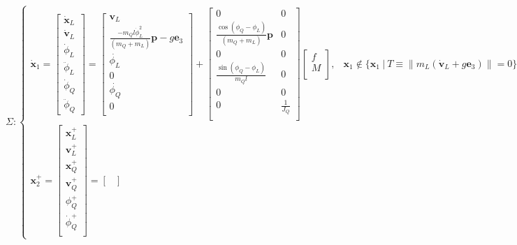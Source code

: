 \documentclass[11pt]{article}
\begin{document}
\[
 \Sigma :
\begin{cases}
\dot{\mathbf{x}}_1 = 
\begin{bmatrix}
       \dot{\mathbf{x}}_L \\ \dot{\mathbf{v}}_L \\ \dot{\phi}_L \\ \ddot{\phi}_L \\ \dot{\phi}_Q \\ \ddot{\phi}_Q
\end{bmatrix}
= 
\begin{bmatrix}
       \mathbf{v}_L \\
       \frac{ - m_Q l \dot{\phi}_L^2 } { (m_Q+m_L) } \mathbf{p} - g \mathbf{e}_3 \\
       \dot{\phi_L} \\
       0 \\
       \dot{\phi_Q} \\
       0 \\
\end{bmatrix}
+ 
\begin{bmatrix}
       0 & 0 \\
       \frac{ \cos(\phi_Q - \phi_L) }{ (m_Q + m_L) } \mathbf{p} & 0 \\
       0 & 0 \\
       \frac{ \sin(\phi_Q - \phi_L) } {m_Q l} & 0 \\
       0 & 0 \\
       0 & \frac{1}{J_Q} \\
\end{bmatrix}
\begin{bmatrix}
       f \\
       M \\
\end{bmatrix}, 
& 
\mathbf{x}_1 \not\in \{ \mathbf{x}_1 \ | \  T \equiv \| m_L(\mathbf{\dot{v}}_L + g \mathbf{e}_3) \| = 0 \} \\
\mathbf{x}_2^+ = 
\begin{bmatrix}
       \mathbf{x}_L^+ \\ \mathbf{v}_L^+ \\ \mathbf{x}_Q^+ \\ \mathbf{v}_Q^+ \\ \phi_Q^+ \\ \dot{\phi}_Q^+ \\
\end{bmatrix}
= 
\begin{bmatrix}

\end{bmatrix}
\end{cases}\]
\end{document}
